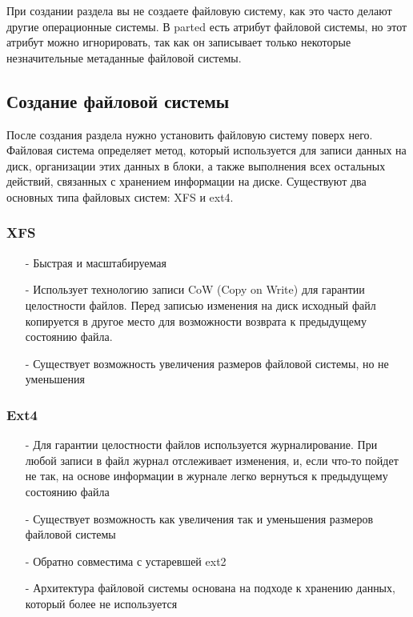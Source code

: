 \documentclass[14pt, a4paper]{article}
\begin{document}
\vspace{0.2cm}

При создании раздела вы не создаете файловую систему, как это часто делают другие операционные
системы. В \colorbox{backcolour}{parted} есть атрибут файловой системы, но этот атрибут можно игнорировать, так как он
записывает только некоторые незначительные метаданные файловой системы.

\subsection*{Создание файловой системы} 

После создания раздела нужно установить файловую систему поверх него. Файловая система
определяет метод, который используется для записи данных на диск, организации этих данных в
блоки, а также выполнения всех остальных действий, связанных с хранением информации на диске.
Существуют два основных типа файловых систем: XFS и ext4.

\subsubsection*{XFS} 

\begin{itemize}
    \item[-] Быстрая и масштабируемая
    \item[-] Использует технологию записи CoW (Copy on Write) для гарантии целостности файлов.
    Перед записью изменения на диск исходный файл копируется в другое место для
    возможности возврата к предыдущему состоянию файла.
    \item[-] Существует возможность увеличения размеров файловой системы, но не уменьшения
\end{itemize}

\subsubsection*{Ext4} 

\begin{itemize}
    \item[-] Для гарантии целостности файлов используется журналирование. При любой записи в файл
    журнал отслеживает изменения, и, если что-то пойдет не так, на основе информации в
    журнале легко вернуться к предыдущему состоянию файла
    \item[-] Существует возможность как увеличения так и уменьшения размеров файловой системы
    \item[-] Обратно совместима с устаревшей ext2
    \item[-] Архитектура файловой системы основана на подходе к хранению данных, который более не
    используется  
\end{itemize}
\end{document}
